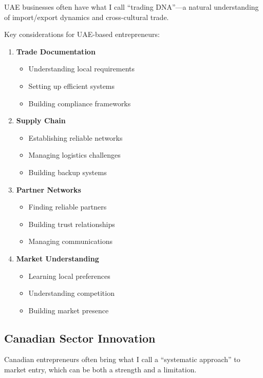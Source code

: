UAE businesses often have what I call ``trading DNA''—a natural understanding of import/export dynamics and cross-cultural trade.

Key considerations for UAE-based entrepreneurs:

\begin{enumerate}
    \item \textbf{Trade Documentation}
    \begin{itemize}
        \item Understanding local requirements
        \item Setting up efficient systems
        \item Building compliance frameworks
    \end{itemize}

    \item \textbf{Supply Chain}
    \begin{itemize}
        \item Establishing reliable networks
        \item Managing logistics challenges
        \item Building backup systems
    \end{itemize}

    \item \textbf{Partner Networks}
    \begin{itemize}
        \item Finding reliable partners
        \item Building trust relationships
        \item Managing communications
    \end{itemize}

    \item \textbf{Market Understanding}
    \begin{itemize}
        \item Learning local preferences
        \item Understanding competition
        \item Building market presence
    \end{itemize}
\end{enumerate}

\subsection{Canadian Sector Innovation}\label{subsec:canadian-sector-innovation}

Canadian entrepreneurs often bring what I call a ``systematic approach'' to market entry, which can be both a strength and a limitation.

